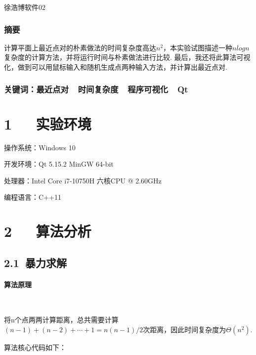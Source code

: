 \documentclass[UTF8]{ctexart}
\begin{document}
\renewcommand{\thefootnote}{\fnsymbol{footnote}}
\linespread{1.4}
\title{\vspace{-5em}\vspace{-2.5em}}
\date{}
\maketitle
\begin{center}
{\fangsong 徐浩博\quad 软件02}
\end{center}

\subsubsection*{摘要}
{\kaishu\normalsize  计算平面上最近点对的朴素做法的时间复杂度高达$n^2$，本实验试图描述一种$nlogn$复杂度的计算方法，并将运行时间与朴素做法进行比较. 最后，我还将此算法可视化，做到可以用鼠标输入和随机生成点两种输入方法，并计算出最近点对.}
\subsubsection*{关键词：最近点对\ \ 时间复杂度\ \ 程序可视化\ \ Qt\vspace{1.5em}}

\section*{1\ \ \ 实验环境}
操作系统：Windows 10\par
开发环境：Qt 5.15.2 MinGW 64-bit\par
处理器：Intel Core i7-10750H 六核CPU @ 2.60GHz\par
编程语言：C++11

\section*{2\ \ \ 算法分析}
\subsection*{2.1\ 暴力求解}
\paragraph{算法原理}\ \par
将n个点两两计算距离，总共需要计算$(n-1)+(n-2)+\cdots+1=n(n-1)/2$次距离，因此时间复杂度为$\Theta(n^2)$.\par
算法核心代码如下：
\end{document}
